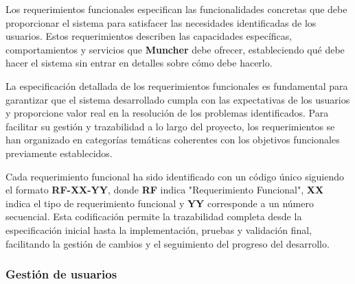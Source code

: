 Los requerimientos funcionales especifican las funcionalidades concretas que debe proporcionar el sistema para satisfacer las necesidades identificadas de los usuarios. Estos requerimientos describen las capacidades específicas, comportamientos y servicios que \textbf{Muncher} debe ofrecer, estableciendo qué debe hacer el sistema sin entrar en detalles sobre cómo debe hacerlo.

La especificación detallada de los requerimientos funcionales es fundamental para garantizar que el sistema desarrollado cumpla con las expectativas de los usuarios y proporcione valor real en la resolución de los problemas identificados. Para facilitar su gestión y trazabilidad a lo largo del proyecto, los requerimientos se han organizado en categorías temáticas coherentes con los objetivos funcionales previamente establecidos.

Cada requerimiento funcional ha sido identificado con un código único siguiendo el formato \textbf{RF-XX-YY}, donde \textbf{RF} indica "Requerimiento Funcional", \textbf{XX} indica el tipo de requerimiento funcional y \textbf{YY} corresponde a un número secuencial. Esta codificación permite la trazabilidad completa desde la especificación inicial hasta la implementación, pruebas y validación final, facilitando la gestión de cambios y el seguimiento del progreso del desarrollo.



\subsubsection*{Gestión de usuarios}






